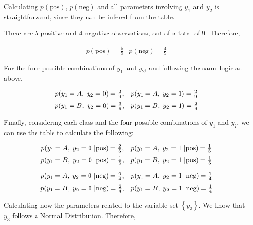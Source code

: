 \documentclass[12pt]{article}
\begin{document}
\begin{enumerate}[leftmargin=\labelsep,resume]
          Calculating $p(\text{pos})$, $p(\text{neg})$ and all parameters involving $y_1$ and
          $y_2$ is straightforward, since they can be infered from the table.

          There are 5 positive and 4 negative observations, out of a total of 9.
          Therefore,

          \[
              \begin{array}{cc}
                  p(\text{pos}) = \frac{5}{9} &
                  p(\text{neg}) = \frac{4}{9}
              \end{array}
          \]

          For the four possible combinations of $y_1$ and $y_2$, and following
          the same logic as above,

          \[
              \begin{array}{cc}
                  p(y_1 = A, \ y_2 = 0) = \frac{2}{9}, &
                  p(y_1 = A, \ y_2 = 1) = \frac{2}{9}    \\[\medskipamount]
                  p(y_1 = B, \ y_2 = 0) = \frac{3}{9}, &
                  p(y_1 = B, \ y_2 = 1) = \frac{2}{9}
              \end{array}
          \]

          Finally, considering each class and the four possible combinations
          of $y_1$ and $y_2$, we can use the table to calculate the following:

          \[
              \begin{array}{cc}
                  p(y_1 = A, \ y_2 = 0 \ | \text{pos}) = \frac{2}{5}, &
                  p(y_1 = A, \ y_2 = 1 \ | \text{pos}) = \frac{1}{5}    \\[\medskipamount]
                  p(y_1 = B, \ y_2 = 0 \ | \text{pos}) = \frac{1}{5}, &
                  p(y_1 = B, \ y_2 = 1 \ | \text{pos}) = \frac{1}{5}
              \end{array}
          \]

          \[
              \begin{array}{cc}
                  p(y_1 = A, \ y_2 = 0 \ | \text{neg}) = \frac{0}{4}, &
                  p(y_1 = A, \ y_2 = 1 \ | \text{neg}) = \frac{1}{4}    \\[\medskipamount]
                  p(y_1 = B, \ y_2 = 0 \ | \text{neg}) = \frac{2}{4}, &
                  p(y_1 = B, \ y_2 = 1 \ | \text{neg}) = \frac{1}{4}
              \end{array}
          \]

          Calculating now the parameters related to the variable set $\left\{y_3\right\}$. We know that $y_3$ follows a Normal Distribution.
          Therefore,


\end{enumerate}
\end{document}
